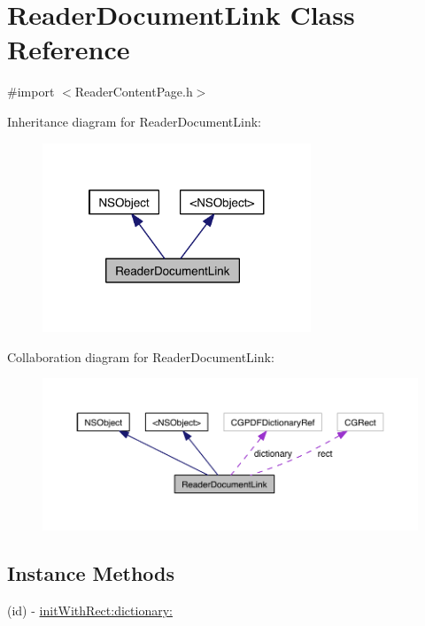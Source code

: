 \hypertarget{interface_reader_document_link}{\section{Reader\-Document\-Link Class Reference}
\label{df/d6f/interface_reader_document_link}
}


{\ttfamily \#import $<$Reader\-Content\-Page.\-h$>$}



Inheritance diagram for Reader\-Document\-Link\-:
\nopagebreak
\begin{figure}[H]
\begin{center}
\leavevmode
\includegraphics[width=227pt]{d8/d79/interface_reader_document_link__inherit__graph}
\end{center}
\end{figure}


Collaboration diagram for Reader\-Document\-Link\-:
\nopagebreak
\begin{figure}[H]
\begin{center}
\leavevmode
\includegraphics[width=350pt]{d7/d92/interface_reader_document_link__coll__graph}
\end{center}
\end{figure}
\subsection*{Instance Methods}
\begin{DoxyCompactItemize}
\item 
(id) -\/ \hyperlink{interface_reader_document_link_aa11819cafba813f5d2f2eda55806d387}{init\-With\-Rect\-:dictionary\-:}
\end{DoxyCompactItemize}
